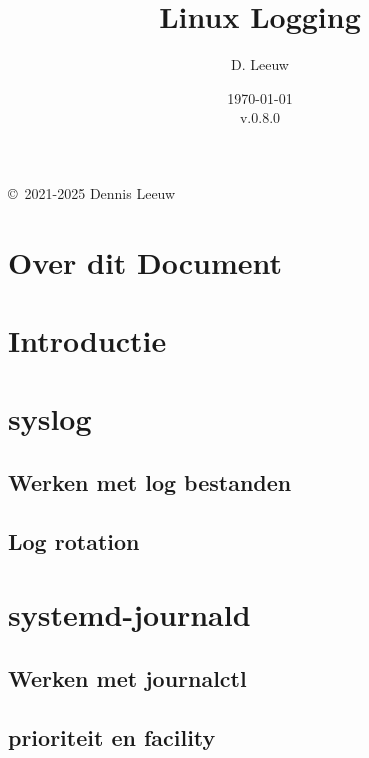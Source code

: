 \documentclass[a4paper,12pt,twoside,openright,titlepage]{book}
\author{D. Leeuw}
\title{Linux Logging}
\date{\today\\v.0.8.0}
\begin{document}

\maketitle

\copyright\ 2021-2025 Dennis Leeuw\\




\frontmatter
\chapter{Over dit Document}
%
%

\tableofcontents

\mainmatter

\chapter{Introductie}


\chapter{syslog}\label{sec:syslog}


\section{Werken met log bestanden}

\section{Log rotation}\label{sec:logrotate}


\chapter{systemd-journald}\label{sec:journalctl}

\section{Werken met journalctl}

\section{prioriteit en facility}\label{sec:journalctl-prio_fac}


\printindex
\end{document}
